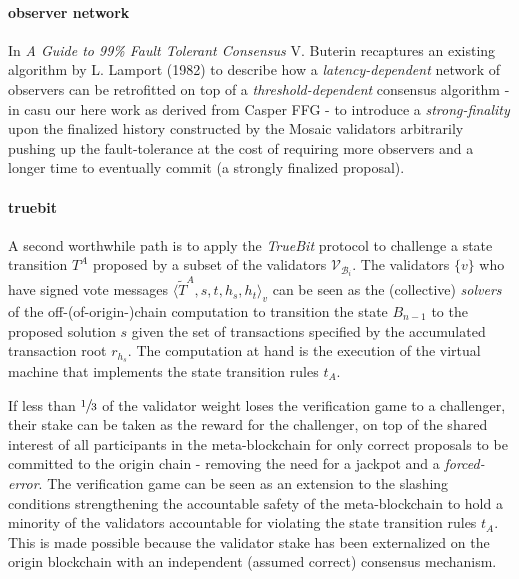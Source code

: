 \documentclass[12pt,a4paper]{article}
\begin{document}
\paragraph{observer network} In \textit{A Guide to 99\% Fault Tolerant Consensus}\cite{honestobserver} V. Buterin recaptures an existing algorithm by L. Lamport (1982) to describe how a \emph{latency-dependent} network of observers can be retrofitted on top of a \emph{threshold-dependent} consensus algorithm - in casu our here work as derived from Casper FFG - to introduce a \emph{strong-finality} upon the finalized history constructed by the Mosaic validators arbitrarily pushing up the fault-tolerance at the cost of requiring more observers and a longer time to eventually commit (a strongly finalized proposal).

\paragraph{truebit} A second worthwhile path is to apply the \textit{TrueBit}\cite{truebit} protocol to challenge a state transition $T^A$ proposed by a subset of the validators $\mathcal{V}_{\mathcal{B}_i}$.
The validators $\{v\}$ who have signed vote messages $\langle\tilde{T}^A, s, t, h_s, h_t\rangle_v$ can be seen as the (collective) \emph{solvers} of the off-(of-origin-)chain computation to transition the state $B_{n-1}$ to the proposed solution $s$ given the set of transactions specified by the accumulated transaction root $r_{h_s}$.
The computation at hand is the execution of the virtual machine that implements the state transition rules $t_A$.

If less than $\sfrac{1}{3}$ of the validator weight loses the verification game to a challenger, their stake can be taken as the reward for the challenger, on top of the shared interest of all participants in the meta-blockchain for only correct proposals to be committed to the origin chain - removing the need for a jackpot and a \emph{forced-error}.
The verification game can be seen as an extension to the slashing conditions strengthening the accountable safety of the meta-blockchain to hold a minority of the validators accountable for violating the state transition rules $t_A$.
This is made possible because the validator stake has been externalized on the origin blockchain with an independent (assumed correct) consensus mechanism.
\end{document}
